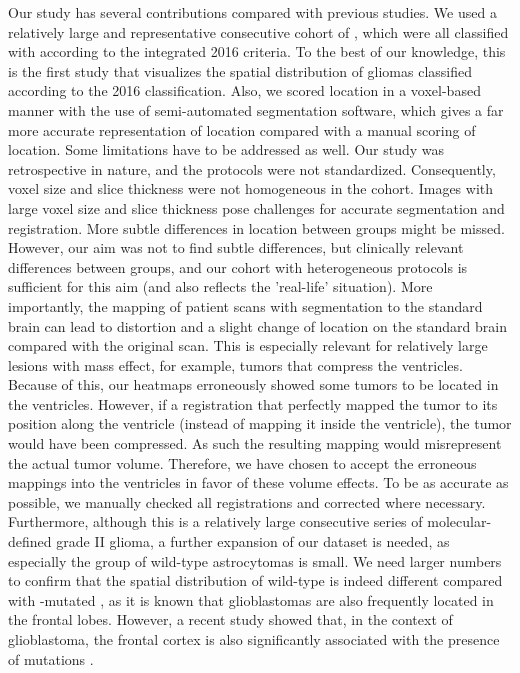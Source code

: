 Our study has several contributions compared with previous studies.
We used a relatively large and representative consecutive cohort of , which were all classified with  according to the integrated  2016 criteria.
To the best of our knowledge, this is the first study that visualizes the spatial distribution of gliomas classified according to the  2016 classification.
Also, we scored location in a voxel-based manner with the use of semi-automated segmentation software, which gives a far more accurate representation of location compared with a manual scoring of location.
Some limitations have to be addressed as well.
Our study was retrospective in nature, and the  protocols were not standardized.
Consequently, voxel size and slice thickness were not homogeneous in the cohort.
Images with large voxel size and slice thickness pose challenges for accurate segmentation and registration.
More subtle differences in location between groups might be missed.
However, our aim was not to find subtle differences, but clinically relevant differences between groups, and our cohort with heterogeneous  protocols is sufficient for this aim (and also reflects the 'real-life' situation).
More importantly, the mapping of patient  scans with segmentation to the  standard brain can lead to distortion and a slight change of location on the standard brain compared with the original  scan.
This is especially relevant for relatively large lesions with mass effect, for example, tumors that compress the ventricles.
Because of this, our heatmaps erroneously showed some tumors to be located in the ventricles.
However, if a registration that perfectly mapped the tumor to its position along the ventricle (instead of mapping it inside the ventricle), the tumor would have been compressed.
As such the resulting mapping would misrepresent the actual tumor volume.
Therefore, we have chosen to accept the erroneous mappings into the ventricles in favor of these volume effects.
To be as accurate as possible, we manually checked all registrations and corrected where necessary.
Furthermore, although this is a relatively large consecutive series of molecular-defined grade II glioma, a further expansion of our dataset is needed, as especially the group of  wild-type astrocytomas is small.
We need larger numbers to confirm that the spatial distribution of  wild-type  is indeed different compared with -mutated , as it is known that glioblastomas are also frequently located in the frontal lobes.
However, a recent study showed that, in the context of glioblastoma, the frontal cortex is also significantly associated with the presence of  mutations \autocite{tejada2018voxel}.

